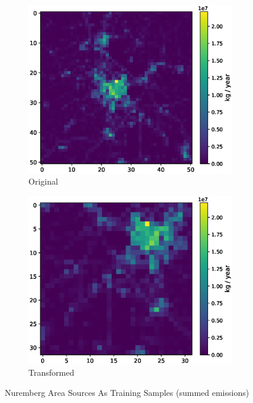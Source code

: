 \begin{figure}[h!]
    \centering
    \begin{subfigure}{0.4\textwidth}
        \centering
        \includegraphics[width=\linewidth]{figures/03_dataset/nuernberg/nuernberg.eps}
        \caption{Original}
    \end{subfigure}
    \begin{subfigure}{0.4\textwidth}
        \centering
        \includegraphics[width=\linewidth]{figures/03_dataset/nuernberg/nuernberg_transformed.eps}
        \caption{Transformed}
    \end{subfigure}
    \caption{Nuremberg Area Sources As Training Samples (summed emissions)}
    \label{fig:nuernberg_emissions}
\end{figure}

